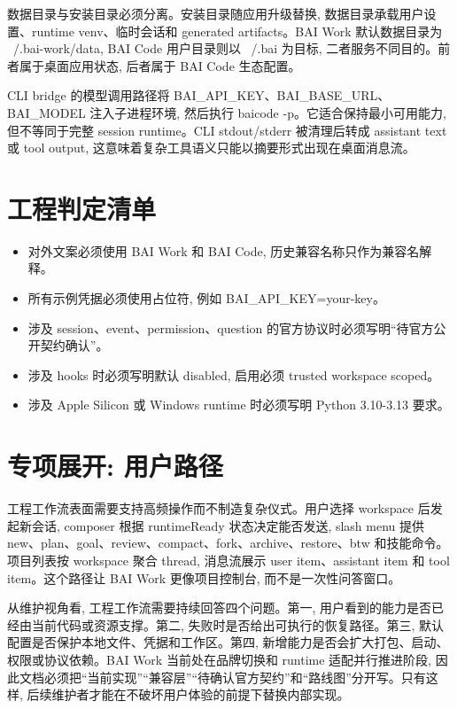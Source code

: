 数据目录与安装目录必须分离。安装目录随应用升级替换, 数据目录承载用户设置、runtime venv、临时会话和 generated artifacts。BAI Work 默认数据目录为 ~/.bai-work/data, BAI Code 用户目录则以 ~/.bai 为目标, 二者服务不同目的。前者属于桌面应用状态, 后者属于 BAI Code 生态配置。

CLI bridge 的模型调用路径将 BAI\_API\_KEY、BAI\_BASE\_URL、BAI\_MODEL 注入子进程环境, 然后执行 baicode -p。它适合保持最小可用能力, 但不等同于完整 session runtime。CLI stdout/stderr 被清理后转成 assistant text 或 tool output, 这意味着复杂工具语义只能以摘要形式出现在桌面消息流。

\section{工程判定清单}
\begin{itemize}
  \item 对外文案必须使用 BAI Work 和 BAI Code, 历史兼容名称只作为兼容名解释。
  \item 所有示例凭据必须使用占位符, 例如 BAI\_API\_KEY=your-key。
  \item 涉及 session、event、permission、question 的官方协议时必须写明“待官方公开契约确认”。
  \item 涉及 hooks 时必须写明默认 disabled, 启用必须 trusted workspace scoped。
  \item 涉及 Apple Silicon 或 Windows runtime 时必须写明 Python 3.10-3.13 要求。
\end{itemize}

\section{专项展开: 用户路径}
工程工作流表面需要支持高频操作而不制造复杂仪式。用户选择 workspace 后发起新会话, composer 根据 runtimeReady 状态决定能否发送, slash menu 提供 new、plan、goal、review、compact、fork、archive、restore、btw 和技能命令。项目列表按 workspace 聚合 thread, 消息流展示 user item、assistant item 和 tool item。这个路径让 BAI Work 更像项目控制台, 而不是一次性问答窗口。

从维护视角看, 工程工作流需要持续回答四个问题。第一, 用户看到的能力是否已经由当前代码或资源支撑。第二, 失败时是否给出可执行的恢复路径。第三, 默认配置是否保护本地文件、凭据和工作区。第四, 新增能力是否会扩大打包、启动、权限或协议依赖。BAI Work 当前处在品牌切换和 runtime 适配并行推进阶段, 因此文档必须把“当前实现”“兼容层”“待确认官方契约”和“路线图”分开写。只有这样, 后续维护者才能在不破坏用户体验的前提下替换内部实现。

